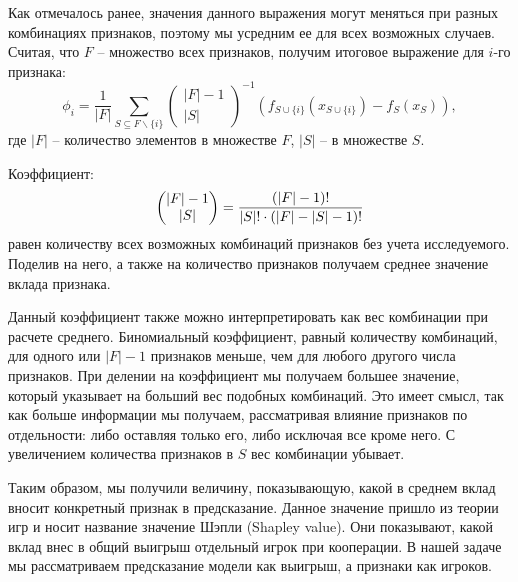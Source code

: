 Как отмечалось ранее, значения данного выражения могут меняться при разных комбинациях признаков, поэтому мы усредним ее для всех возможных случаев. Считая, что $F$ -- множество всех признаков, получим итоговое выражение для $i$-го признака:
\[
\phi_i = \frac{1}{|F|} \sum\limits_{S \subseteq F \backslash \{i\}}
\begin{pmatrix}
|F| - 1 \\
|S|
\end{pmatrix}^{-1}
(f_{S \cup \{i\}}(x_{S \cup \{i\}}) - f_S(x_S)),
\]
где $|F|$ -- количество элементов в множестве $F$, $|S|$ -- в множестве $S$.

Коэффициент:
\[
\displaystyle \begin{pmatrix}
|F| - 1 \\
|S|
\end{pmatrix} = \frac{(|F|-1)!}{|S|! \cdot (|F| - |S| - 1)!}
\]
равен количеству всех возможных комбинаций признаков без учета исследуемого. Поделив на него, а также на количество признаков получаем среднее значение вклада признака. %

Данный коэффициент также можно интерпретировать как вес комбинации при расчете среднего. Биномиальный коэффициент, равный количеству комбинаций, для одного или $|F|-1$ признаков меньше, чем для любого другого числа признаков. При делении на коэффициент мы получаем большее значение, который указывает на больший вес подобных комбинаций. Это имеет смысл, так как больше информации мы получаем, рассматривая влияние признаков по отдельности: либо оставляя только его, либо исключая все кроме него. С увеличением количества признаков в $S$ вес комбинации убывает.

Таким образом, мы получили величину, показывающую, какой в среднем вклад вносит конкретный признак в предсказание. Данное значение пришло из теории игр и носит название значение Шэпли (Shapley value). Они показывают, какой вклад внес в общий выигрыш отдельный игрок при кооперации. В нашей задаче мы рассматриваем предсказание модели как выигрыш, а признаки как игроков.
